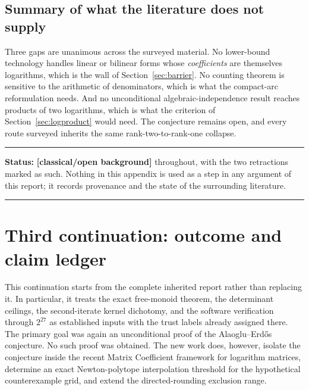 \documentclass[11pt,oneside]{article}
\theoremstyle{definition}
\theoremstyle{remark}
\newcommand{\statusknown}{\textcolor{classicalgray}{\textbf{[classical/open background]}}}
\newenvironment{statusbox}[1]
{\begin{center}\begin{minipage}{0.94\textwidth}\raggedright\hbadness=10000\hrule
\vspace{0.45em}\textbf{Status:} #1\par\vspace{0.35em}}
{\vspace{0.35em}\hrule\end{minipage}\end{center}}
\begin{document}
\subsection{Summary of what the literature does not supply}

Three gaps are unanimous across the surveyed material.  No lower-bound technology handles
linear or bilinear forms whose \emph{coefficients} are themselves logarithms, which is the wall
of Section~\ref{sec:barrier}.  No counting theorem is sensitive to the arithmetic of
denominators, which is what the compact-arc reformulation needs.  And no unconditional
algebraic-independence result reaches products of two logarithms, which is what the criterion
of Section~\ref{sec:logproduct} would need.  The conjecture remains open, and every route
surveyed inherits the same rank-two-to-rank-one collapse.

\begin{statusbox}{\statusknown{} throughout, with the two retractions marked as such.  Nothing
in this appendix is used as a step in any argument of this report; it records provenance and
the state of the surrounding literature.}
\end{statusbox}

\clearpage
\setcounter{section}{0}
\renewcommand{\thesection}{R\arabic{section}}
\renewcommand{\theHsection}{R.\arabic{section}}
\renewcommand{\theHsubsection}{\theHsection.\arabic{subsection}}
\renewcommand{\theHsubsubsection}{\theHsubsection.\arabic{subsubsection}}
\renewcommand{\theHtheorem}{\theHsection.\arabic{theorem}}

\section{Third continuation: outcome and claim ledger}
\label{sec:third-continuation}

This continuation starts from the complete inherited report rather than replacing it.  In
particular, it treats the exact free-monoid theorem, the determinant ceilings, the
second-iterate kernel dichotomy, and the software verification through $2^{27}$ as established
inputs with the trust labels already assigned there.  The primary goal was again an
unconditional proof of the Alaoglu--Erd\H{o}s conjecture.  No such proof was obtained.  The
new work does, however, isolate the conjecture inside the recent Matrix Coefficient framework
for logarithm matrices, determine an exact Newton-polytope interpolation threshold for the
hypothetical counterexample grid, and extend the directed-rounding exclusion range.
\end{document}

